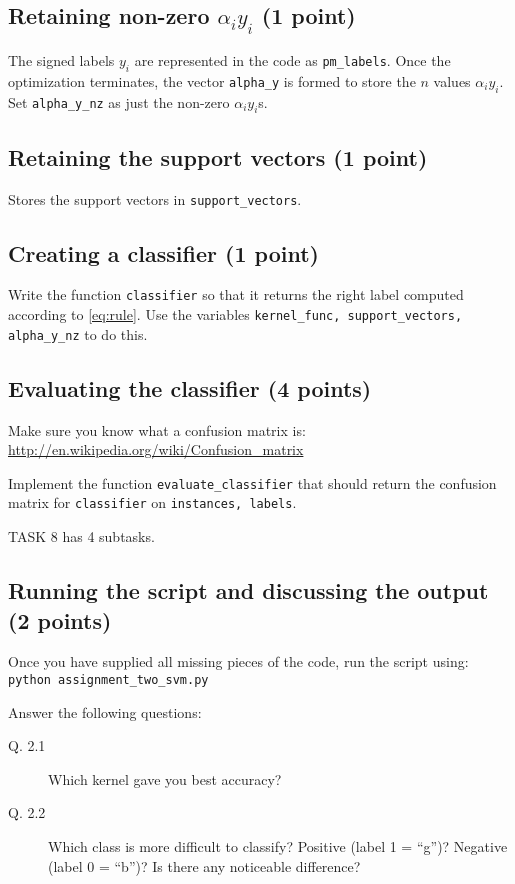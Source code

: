 \documentclass{article}
\begin{document}
\subsection{Retaining non-zero $\alpha_i y_i$ (1 point)}

The signed labels $y_i$ are represented in the code as {\tt pm\_labels}. Once the optimization terminates, the vector {\tt alpha\_y} is formed
to store the $n$ values $\alpha_i y_i$. Set {\tt alpha\_y\_nz} as just the non-zero $\alpha_i y_i$s.

\subsection{Retaining the support vectors (1 point)}

Stores the support vectors in {\tt support\_vectors}.

\subsection{Creating a classifier (1 point)}

Write the function {\tt classifier} so that it returns the right label computed according to \eqref{eq:rule}. Use the variables
{\tt kernel\_func, support\_vectors, alpha\_y\_nz} to do this.

\subsection{Evaluating the classifier (4 points)}

Make sure you know what a confusion matrix is:
\url{http://en.wikipedia.org/wiki/Confusion\_matrix}

Implement the function {\tt evaluate\_classifier} that should return the confusion matrix for {\tt classifier} on {\tt instances, labels}.

TASK 8 has 4 subtasks.

\subsection{Running the script and discussing the output (2 points)}

Once you have supplied all missing pieces of the code, run the script using:\\
{\tt python assignment\_two\_svm.py}

Answer the following questions:
\begin{description}
\item[Q. 2.1]
Which kernel gave you best accuracy?
\item[Q. 2.2]
Which class is more difficult to classify? Positive (label 1 = ``g'')? Negative (label 0 = ``b'')? Is there any noticeable difference?
\end{description}
\end{document}
